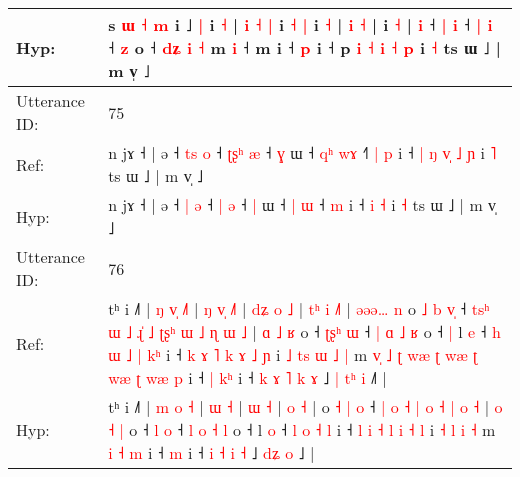 \documentclass[10pt]{article}
\DeclareRobustCommand{\hl}[1]{{\textcolor{red}{#1}}}
\begin{document}
\begin{longtable}{ll}
 \\
Hyp: & s\hl{}\hl{}\hl{}\hl{}\hl{}\hl{} \hl{}\hl{ɯ} \hl{˧} \hl{}\hl{m} i ˩ \hl{}\hl{|} i \hl{}\hl{˧} |\hl{}\hl{}\hl{}\hl{}\hl{}\hl{}\hl{}\hl{} \hl{}\hl{i} \hl{˧} \hl{}\hl{|} i \hl{˧} \hl{}\hl{|} i \hl{}\hl{˧} |\hl{}\hl{}\hl{} \hl{i} \hl{˧} |\hl{}\hl{}\hl{} i \hl{}\hl{˧} |\hl{}\hl{} \hl{i} ˧ \hl{|} \hl{}\hl{i} ˧ \hl{|} \hl{i} ˧ \hl{z} o ˧ \hl{}\hl{d}\hl{ʑ} \hl{i} \hl{˧} m\hl{}\hl{}\hl{}\hl{}\hl{}\hl{}\hl{}\hl{} \hl{i} ˧ m i ˧ \hl{p} i ˧ p\hl{}\hl{} \hl{i} \hl{˧} \hl{i} \hl{˧} \hl{p} i \hl{˧} ts ɯ ˩ | m v̩ ˩
 \\
\midrule
Utterance ID: & 75 \\
Ref: & n jɤ ˧ | ə ˧ \hl{t}\hl{s} \hl{o} ˧ \hl{ʈ}\hl{ʂ}\hl{ʰ} \hl{æ} ˧ \hl{ɣ} ɯ ˧ \hl{q}\hl{ʰ} \hl{w}\hl{ɤ} ˧\hl{˥}\hl{ }\hl{|} \hl{p} i ˧\hl{ }\hl{|}\hl{ }\hl{ŋ}\hl{ }\hl{v}\hl{̩} \hl{˩} \hl{ɲ} i \hl{˥} ts ɯ ˩ | m v̩ ˩
 \\
Hyp: & n jɤ ˧ | ə ˧ \hl{}\hl{|} \hl{ə} ˧ \hl{}\hl{}\hl{|} \hl{ə} ˧ \hl{|} ɯ ˧ \hl{}\hl{|} \hl{}\hl{ɯ} ˧\hl{}\hl{}\hl{} \hl{m} i ˧\hl{}\hl{}\hl{}\hl{}\hl{}\hl{}\hl{} \hl{i} \hl{˧} i \hl{˧} ts ɯ ˩ | m v̩ ˩
 \\
\midrule
Utterance ID: & 76 \\
Ref: & tʰ i ˩˥ | \hl{ŋ} \hl{v}\hl{̩} \hl{˩}\hl{˥} |\hl{ }\hl{ŋ} \hl{v}\hl{̩} \hl{˩}\hl{˥} |\hl{ }\hl{d}\hl{ʑ} \hl{o} \hl{˩} |\hl{ }\hl{t}\hl{ʰ} \hl{i} \hl{˩}\hl{˥} |\hl{ }\hl{ə}\hl{ə}\hl{ə}\hl{…}\hl{ }\hl{n} o \hl{˩} \hl{b} \hl{v}\hl{̩} ˧\hl{ }\hl{t}\hl{s}\hl{ʰ}\hl{ }\hl{ɯ} \hl{˩} \hl{ɻ}\hl{̍} \hl{˩} \hl{ʈ}\hl{ʂ}\hl{ʰ} \hl{ɯ} \hl{˩} \hl{ɳ} \hl{ɯ} \hl{˩} | \hl{ɑ} \hl{˩} \hl{ʁ} o ˧ \hl{ʈ}\hl{ʂ}\hl{ʰ} \hl{ɯ} ˧ \hl{|} \hl{ɑ} \hl{˩} \hl{ʁ} o ˧\hl{ }\hl{|} l \hl{e} ˧\hl{ }\hl{h} \hl{ɯ} \hl{˩} \hl{|} \hl{k}\hl{ʰ} i ˧ \hl{k} \hl{ɤ} \hl{˥} \hl{k} \hl{ɤ} \hl{˩} \hl{ɲ} i\hl{ }\hl{˩} \hl{t}\hl{s} \hl{ɯ} \hl{˩} \hl{|} m\hl{ }\hl{v}\hl{̩}\hl{ }\hl{˩}\hl{ }\hl{ʈ}\hl{ }\hl{w}\hl{æ}\hl{ }\hl{ʈ}\hl{ }\hl{w}\hl{æ}\hl{ }\hl{ʈ}\hl{ }\hl{w}\hl{æ} \hl{ʈ} \hl{w}\hl{æ} \hl{p} i ˧\hl{ }\hl{|} \hl{k}\hl{ʰ} i ˧\hl{ }\hl{k} \hl{ɤ} \hl{˥} \hl{k} \hl{ɤ} ˩\hl{ }\hl{|} \hl{t}\hl{ʰ} \hl{i} ˩\hl{˥} |
 \\
Hyp: & tʰ i ˩˥ | \hl{m} \hl{}\hl{o} \hl{}\hl{˧} |\hl{}\hl{} \hl{}\hl{ɯ} \hl{}\hl{˧} |\hl{}\hl{}\hl{} \hl{ɯ} \hl{˧} |\hl{}\hl{}\hl{} \hl{o} \hl{}\hl{˧} |\hl{}\hl{}\hl{}\hl{}\hl{}\hl{}\hl{} o \hl{˧} \hl{|} \hl{}\hl{o} ˧\hl{}\hl{}\hl{}\hl{}\hl{}\hl{} \hl{|} \hl{}\hl{o} \hl{˧} \hl{}\hl{}\hl{|} \hl{o} \hl{˧} \hl{|} \hl{o} \hl{˧} | \hl{o} \hl{˧} \hl{|} o ˧ \hl{}\hl{}\hl{l} \hl{o} ˧ \hl{l} \hl{o} \hl{˧} \hl{l} o ˧\hl{}\hl{} l \hl{o} ˧\hl{}\hl{} \hl{l} \hl{o} \hl{˧} \hl{}\hl{l} i ˧ \hl{l} \hl{i} \hl{˧} \hl{l} \hl{i} \hl{˧} \hl{l} i\hl{}\hl{} \hl{}\hl{˧} \hl{l} \hl{i} \hl{˧} m\hl{}\hl{}\hl{}\hl{}\hl{}\hl{}\hl{}\hl{}\hl{}\hl{}\hl{}\hl{}\hl{}\hl{}\hl{}\hl{}\hl{}\hl{}\hl{}\hl{} \hl{i} \hl{}\hl{˧} \hl{m} i ˧\hl{}\hl{} \hl{}\hl{m} i ˧\hl{}\hl{} \hl{i} \hl{˧} \hl{i} \hl{˧} ˩\hl{}\hl{} \hl{d}\hl{ʑ} \hl{o} ˩\hl{} |

\end{longtable}
\end{document}
